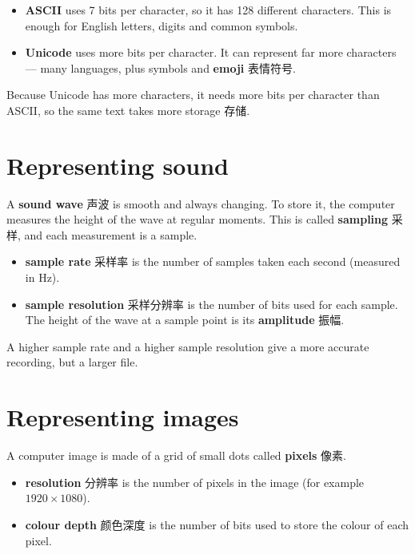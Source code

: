 \documentclass[11pt]{article}
\begin{document}
\begin{itemize}
\item \textbf{ASCII} uses 7 bits per character, so it has 128 different characters. This is enough for English letters, digits and common symbols.

\item \textbf{Unicode} uses more bits per character. It can represent far more characters — many languages, plus symbols and \textbf{emoji} 表情符号.

\end{itemize}

Because Unicode has more characters, it needs more bits per character than ASCII, so the same text takes more storage 存储.

\section*{Representing sound}

A \textbf{sound wave} 声波 is smooth and always changing. To store it, the computer measures the height of the wave at regular moments. This is called \textbf{sampling} 采样, and each measurement is a sample.

\begin{itemize}
\item \textbf{sample rate} 采样率 is the number of samples taken each second (measured in Hz).

\item \textbf{sample resolution} 采样分辨率 is the number of bits used for each sample. The height of the wave at a sample point is its \textbf{amplitude} 振幅.

\end{itemize}

A higher sample rate and a higher sample resolution give a more accurate recording, but a larger file.

\section*{Representing images}

A computer image is made of a grid of small dots called \textbf{pixels} 像素.

\begin{itemize}
\item \textbf{resolution} 分辨率 is the number of pixels in the image (for example $1920 \times 1080$).

\item \textbf{colour depth} 颜色深度 is the number of bits used to store the colour of each pixel.

\end{itemize}
\end{document}
